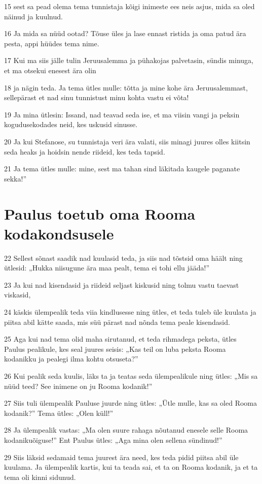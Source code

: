 \par 15 sest sa pead olema tema tunnistaja kõigi inimeste ees neis asjus, mida sa oled näinud ja kuulnud.
\par 16 Ja mida sa nüüd ootad? Tõuse üles ja lase ennast ristida ja oma patud ära pesta, appi hüüdes tema nime.
\par 17 Kui ma siis jälle tulin Jeruusalemma ja pühakojas palvetasin, sündis minuga, et ma otsekui enesest ära olin
\par 18 ja nägin teda. Ja tema ütles mulle: tõtta ja mine kohe ära Jeruusalemmast, sellepärast et nad sinu tunnistust minu kohta vastu ei võta!
\par 19 Ja mina ütlesin: Issand, nad teavad seda ise, et ma viisin vangi ja peksin kogudusekodades neid, kes uskusid sinusse.
\par 20 Ja kui Stefanose, su tunnistaja veri ära valati, siis minagi juures olles kiitsin seda heaks ja hoidsin nende riideid, kes teda tapsid.
\par 21 Ja tema ütles mulle: mine, sest ma tahan sind läkitada kaugele paganate sekka!”

\section*{Paulus toetub oma Rooma kodakondsusele}

\par 22 Sellest sõnast saadik nad kuulasid teda, ja siis nad tõstsid oma häält ning ütlesid: „Hukka niisugune ära maa pealt, tema ei tohi ellu jääda!”
\par 23 Ja kui nad kisendasid ja riideid seljast kiskusid ning tolmu vastu taevast viskasid,
\par 24 käskis ülempealik teda viia kindlusesse ning ütles, et teda tuleb üle kuulata ja piitsa abil kätte saada, mis süü pärast nad nõnda tema peale kisendasid.
\par 25 Aga kui nad tema olid maha sirutanud, et teda rihmadega peksta, ütles Paulus pealikule, kes seal juures seisis: „Kas teil on luba peksta Rooma kodanikku ja pealegi ilma kohtu otsuseta?”
\par 26 Kui pealik seda kuulis, läks ta ja teatas seda ülempealikule ning ütles: „Mis sa nüüd teed? See inimene on ju Rooma kodanik!”
\par 27 Siis tuli ülempealik Pauluse juurde ning ütles: „Ütle mulle, kas sa oled Rooma kodanik?” Tema ütles: „Olen küll!”
\par 28 Ja ülempealik vastas: „Ma olen suure rahaga nõutanud enesele selle Rooma kodanikuõiguse!” Ent Paulus ütles: „Aga mina olen sellena sündinud!”
\par 29 Siis läksid sedamaid tema juurest ära need, kes teda pidid piitsa abil üle kuulama. Ja ülempealik kartis, kui ta teada sai, et ta on Rooma kodanik, ja et ta tema oli kinni sidunud.

